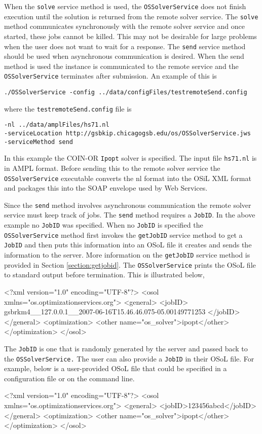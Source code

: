 \documentclass[11pt]{article}
\renewcommand{\_}{{\char"5F}}
\renewcommand{\{}{{\char"7B}}
\renewcommand{\}}{{\char"7D}}
\renewcommand{\^}{{\char"0D}}
\renewcommand{\'}{{\char"0D}}
\begin{document}
When the {\tt solve} service method is used, the {\tt OSSolverService} does not finish execution until the solution is returned from the remote solver service. The {\tt solve} method communicates synchronously with the remote solver service and once started, these jobs cannot be killed. This may not be desirable for large problems when the user does not want to wait for a response. The {\tt send} service method should be used when asynchronous communication is desired. When the send method is used the instance is communicated to the remote service and the {\tt OSSolverService} terminates after submission. An example of this is
\begin{verbatim}
./OSSolverService -config ../data/configFiles/testremoteSend.config
\end{verbatim}
where the {\tt testremoteSend.config} file is
\begin{verbatim}
-nl ../data/amplFiles/hs71.nl
-serviceLocation http://gsbkip.chicagogsb.edu/os/OSSolverService.jws
-serviceMethod send
\end{verbatim}
In this example the COIN-OR {\tt Ipopt} solver is specified. The input file {\tt hs71.nl} is in AMPL format. Before sending this to the remote solver service the {\tt OSSolverService} executable converts  the nl format into the OSiL XML format and packages this into the SOAP envelope used by Web Services.

Since the {\tt send} method involves asynchronous communication the remote solver service must keep track of jobs. The {\tt send} method requires a {\tt JobID}. In the above example  no {\tt JobID} was specified. When no {\tt JobID} is specified the {\tt OSSolverService} method first invokes the {\tt getJobID} service method to get a {\tt JobID} and then puts this information into an OSoL file it creates and sends the information to the server. More information on the {\tt getJobID} service method is provided in Section \ref{section:getjobid}.    The {\tt OSSolverService} prints the OSoL file to standard output before termination. This is illustrated below,
\begin{verbatimtab}[4]
<?xml version="1.0" encoding="UTF-8"?>
<osol xmlns="os.optimizationservices.org">
	<general>
		<jobID>
		gsbrkm4__127.0.0.1__2007-06-16T15.46.46.075-05.00149771253
		</jobID>
	</general>
    <optimization>
    	<other name="os_solver">ipopt</other>
    </optimization>
</osol>
\end{verbatimtab}
The {\tt JobID} is one that is randomly generated by the server and passed back to the {\tt OSSolverService.} The user can also provide a {\tt JobID} in their OSoL file. For example, below is a user-provided OSoL file that could be specified in a configuration file or on the command line.
\begin{verbatimtab}[4]
<?xml version="1.0" encoding="UTF-8"?>
<osol xmlns="os.optimizationservices.org">
	<general>
		<jobID>123456abcd</jobID>
	</general>
    <optimization>
    	<other name="os_solver">ipopt</other>
    </optimization>
</osol>
\end{verbatimtab}
\end{document}
